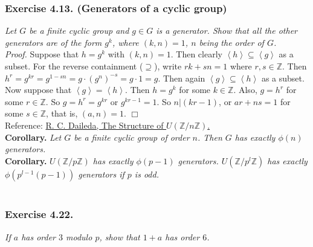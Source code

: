\documentclass{article}
\begin{document}



\subsubsection*{Exercise 4.13. (Generators of a cyclic group)}
\emph{Let $G$ be a finite cyclic group and $g \in G$ is a generator.
Show that all the other generators are of the form $g^k$,
where $(k, n) = 1$, $n$ being the order of $G$.} \\

\emph{Proof.}
Suppose that $h = g^k$ with $(k, n) = 1$.
Then clearly $\left \langle h \right \rangle \subseteq \left \langle g \right \rangle$
as a subset. For the reverse containment ($\supseteq$),
write $rk + sn = 1$ where $r, s \in \mathbb{Z}$. Then
$h^r = g^{kr} = g^{1 - sn} = g \cdot (g^n)^{-s} = g \cdot 1 = g$. Then again
$\left \langle g \right \rangle \subseteq \left \langle h \right \rangle$ as a subset. \\

Now suppose that $\left \langle g \right \rangle = \left \langle h \right \rangle$.
Then $h = g^k$ for some $k \in \mathbb{Z}$. Also, $g = h^r$ for some $r \in \mathbb{Z}$.
So $g = h^r = g^{kr}$ or $g^{kr - 1} = 1$. So $n | (kr - 1)$, or
$ar + ns = 1$ for some $s \in \mathbb{Z}$, that is, $(a, n) = 1$.
$\Box$ \\

Reference:
\href{http://ramanujan.math.trinity.edu/rdaileda/teach/s18/m3341/ZnZ.pdf}
{R. C. Daileda, The Structure of $U(\mathbb{Z}/n\mathbb{Z})$.} \\

\textbf{Corollary.}
\emph{Let $G$ be a finite cyclic group of order $n$.
Then $G$ has exactly $\phi(n)$ generators.} \\

\textbf{Corollary.}
\emph{$U(\mathbb{Z}/p\mathbb{Z})$ has exactly $\phi(p - 1)$ generators.
$U(\mathbb{Z}/p^l\mathbb{Z})$ has exactly $\phi(p^{l-1}(p - 1))$ generators if $p$ is odd.} \\\\






\subsubsection*{Exercise 4.22.}
\emph{If $a$ has order $3$ modulo $p$, show that $1 + a$ has order $6$.} \\
\end{document}
